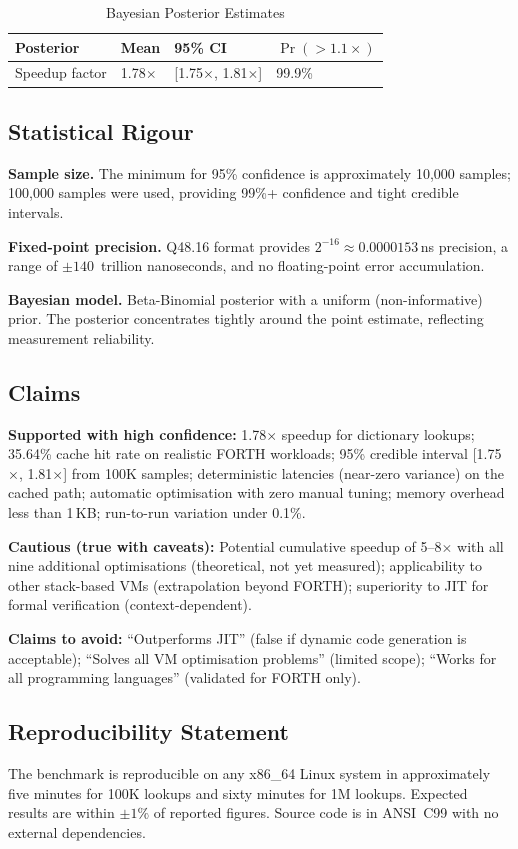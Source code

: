 \begin{table}[h]
\caption{Bayesian Posterior Estimates}
\begin{center}
\begin{tabular}{llll}
\toprule
Posterior & Mean & 95\% CI & $\Pr(>1.1\times)$ \\
\midrule
Speedup factor & 1.78$\times$ & [1.75$\times$, 1.81$\times$] & 99.9\% \\
\bottomrule
\end{tabular}
\end{center}
\end{table}

\subsection{Statistical Rigour}

\textbf{Sample size.} The minimum for 95\% confidence is approximately
10,000 samples; 100,000 samples were used, providing 99\%+ confidence
and tight credible intervals.

\textbf{Fixed-point precision.} Q48.16 format provides $2^{-16} \approx
0.0000153$\,ns precision, a range of $\pm140$~trillion nanoseconds, and
no floating-point error accumulation.

\textbf{Bayesian model.} Beta-Binomial posterior with a uniform
(non-informative) prior. The posterior concentrates tightly around the
point estimate, reflecting measurement reliability.

\subsection{Claims}

\textbf{Supported with high confidence:}
1.78$\times$ speedup for dictionary lookups;
35.64\% cache hit rate on realistic FORTH workloads;
95\% credible interval [1.75$\times$, 1.81$\times$] from 100K samples;
deterministic latencies (near-zero variance) on the cached path;
automatic optimisation with zero manual tuning;
memory overhead less than 1\,KB;
run-to-run variation under 0.1\%.

\textbf{Cautious (true with caveats):}
Potential cumulative speedup of 5--8$\times$ with all nine additional
optimisations (theoretical, not yet measured);
applicability to other stack-based VMs (extrapolation beyond FORTH);
superiority to JIT for formal verification (context-dependent).

\textbf{Claims to avoid:}
``Outperforms JIT'' (false if dynamic code generation is acceptable);
``Solves all VM optimisation problems'' (limited scope);
``Works for all programming languages'' (validated for FORTH only).

\subsection{Reproducibility Statement}

The benchmark is reproducible on any x86\_64 Linux system in approximately
five minutes for 100K lookups and sixty minutes for 1M lookups. Expected
results are within $\pm1\%$ of reported figures. Source code is in ANSI~C99
with no external dependencies.
